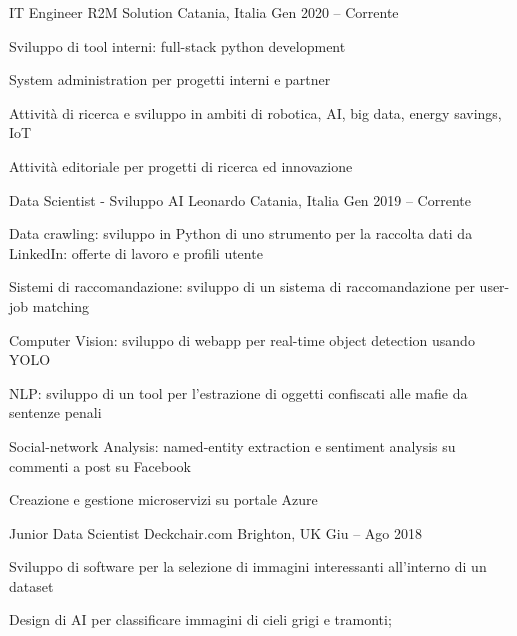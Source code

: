 
  \begin{cventries}
    \cventry
    {IT Engineer}
    {R2M Solution}    
    {Catania, Italia}
    {Gen 2020 -- Corrente}
    {
      \begin{cvitems}
        \item {Sviluppo di tool interni: full-stack python development}
        \item {System administration per progetti interni e partner}
        \item {Attività di ricerca e sviluppo in ambiti di robotica, AI, big data, energy savings, IoT}
        \item {Attività editoriale per progetti di ricerca ed innovazione}
      \end{cvitems}
    }

    \cventry
    {Data Scientist - Sviluppo AI}
    {Leonardo}    
    {Catania, Italia}
    {Gen 2019 -- Corrente}
    {
      \begin{cvitems}
        \item {Data crawling: sviluppo in Python di uno strumento per la raccolta dati da LinkedIn: offerte di lavoro e profili utente}
        \item {Sistemi di raccomandazione: sviluppo di un sistema di raccomandazione per user-job matching}
        \item {Computer Vision: sviluppo di webapp per real-time object detection usando YOLO}
        \item {NLP: sviluppo di un tool per l'estrazione di oggetti confiscati alle mafie da sentenze penali}
        \item {Social-network Analysis: named-entity extraction e sentiment analysis su commenti a post su Facebook}
        \item {Creazione e gestione microservizi su portale Azure}
      \end{cvitems}
    }

    \cventry
    {Junior Data Scientist}
    {Deckchair.com}
    {Brighton, UK}
    {Giu -- Ago 2018}
    {
      \begin{cvitems}
        \item Sviluppo di software per la selezione di immagini interessanti all'interno di un dataset
        \item Design di AI per classificare immagini di cieli grigi e tramonti;
      \end{cvitems}
    }
  \end{cventries}

